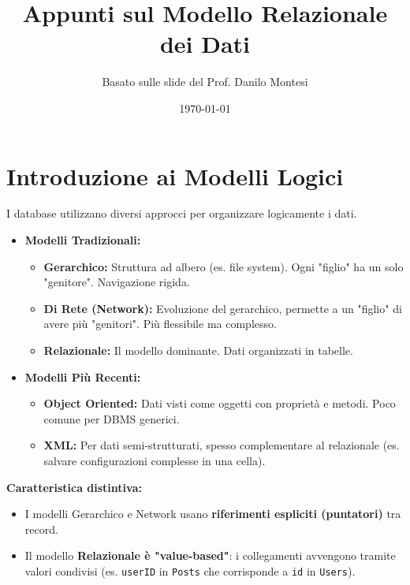 \documentclass{article}
\title{Appunti sul Modello Relazionale dei Dati}
\author{Basato sulle slide del Prof. Danilo Montesi}
\date{\today}
\begin{document}
	
	\maketitle
	\tableofcontents
	\newpage
	
	\section{Introduzione ai Modelli Logici}
	I database utilizzano diversi approcci per organizzare logicamente i dati.
	\begin{itemize}
		\item \textbf{Modelli Tradizionali:}
		\begin{itemize}
			\item \textbf{Gerarchico:} Struttura ad albero (es. file system). Ogni "figlio" ha un solo "genitore". Navigazione rigida.
			\item \textbf{Di Rete (Network):} Evoluzione del gerarchico, permette a un "figlio" di avere più "genitori". Più flessibile ma complesso.
			\item \textbf{Relazionale:} Il modello dominante. Dati organizzati in tabelle.
		\end{itemize}
		\item \textbf{Modelli Più Recenti:}
		\begin{itemize}
			\item \textbf{Object Oriented:} Dati visti come oggetti con proprietà e metodi. Poco comune per DBMS generici.
			\item \textbf{XML:} Per dati semi-strutturati, spesso complementare al relazionale (es. salvare configurazioni complesse in una cella).
		\end{itemize}
	\end{itemize}
	
	\textbf{Caratteristica distintiva:}
	\begin{itemize}
		\item I modelli Gerarchico e Network usano \textbf{riferimenti espliciti (puntatori)} tra record.
		\item Il modello \textbf{Relazionale è "value-based"}: i collegamenti avvengono tramite valori condivisi (es. \texttt{userID} in \texttt{Posts} che corrisponde a \texttt{id} in \texttt{Users}).
	\end{itemize}
	
\end{document}
